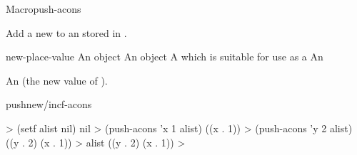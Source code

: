\documentclass[10pt,twoside,english,pdftex]{article}
\begin{document}

\begin{functiondoc}{Macro}{push-acons}{
    }
%
%
  
\fnsyntax

\fnpurpose Add a new   to an
 stored in .

\fnpackage {}

\fnmodule {}

\fnargs
\begin{args}{new-place-value}
\arg[item] An object
\arg[value] An object
\arg[place] A  which is suitable for use as a
 An 
\end{args}

\fnreturns An  (the new value of
). 

\begin{alsos}{pushnew/incf-acons}
\end{alsos}

\fnexamples
%
\W\supp
\begin{example}
  > (setf alist nil)
  nil
  > (push-acons 'x 1 alist)
  ((x . 1))\goodpagebreak
  > (push-acons 'y 2 alist)
  ((y . 2) (x . 1))
  > alist
  ((y . 2) (x . 1))
  >
\end{example}

\end{functiondoc}

\end{document}
